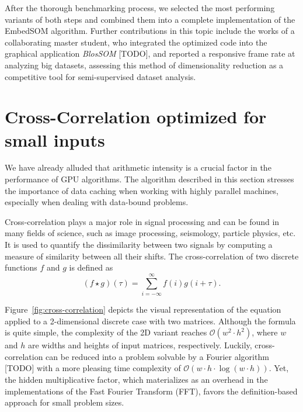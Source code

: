 After the thorough benchmarking process, we selected the most performing variants of both steps and combined them into a complete implementation of the EmbedSOM algorithm. Further contributions in this topic include the works of a collaborating master student, who integrated the optimized code into the graphical application \emph{BlosSOM} [TODO], and reported a responsive frame rate at analyzing big datasets, assessing this method of dimensionality reduction as a competitive tool for semi-supervised dataset analysis.

\section{Cross-Correlation optimized for small inputs}

We have already alluded that arithmetic intensity is a crucial factor in the performance of GPU algorithms. The algorithm described in this section stresses the importance of data caching when working with highly parallel machines, especially when dealing with data-bound problems.

Cross-correlation plays a major role in signal processing and can be found in many fields of science, such as image processing, seismology, particle physics, etc. It is used to quantify the dissimilarity between two signals by computing a measure of similarity between all their shifts. The cross-correlation of two discrete functions $f$ and $g$ is defined as
\begin{equation}
    (f \star g)(\tau) = \sum_{i=-\infty}^{\infty} f(i) g(i+\tau).
\end{equation} 

Figure~\ref{fig:cross-correlation} depicts the visual representation of the equation applied to a 2-dimensional discrete case with two matrices. Although the formula is quite simple, the complexity of the 2D variant reaches $\mathcal{O}(w^2 \cdot h^2)$, where $w$ and $h$ are widths and heights of input matrices, respectively. Luckily, cross-correlation can be reduced into a problem solvable by a Fourier algorithm [TODO] with a more pleasing time complexity of $\mathcal{O}(w\cdot h \cdot \log(w\cdot h))$. Yet, the hidden multiplicative factor, which materializes as an overhead in the implementations of the Fast Fourier Transform (FFT), favors the definition-based approach for small problem sizes.

